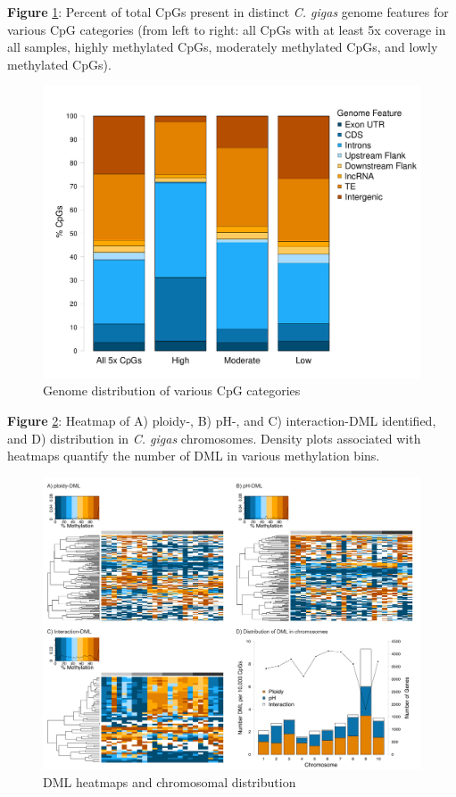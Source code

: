 \documentclass [11pt, proquest] {uwthesis}[2015/03/03]
\begin{document}
\textbf{Figure} \ref{fig:cpglocations}: Percent of total CpGs present in distinct \emph{C. gigas} genome features for various CpG categories (from left to right: all CpGs with at least 5x coverage in all samples, highly methylated CpGs, moderately methylated CpGs, and lowly methylated CpGs).\newline
\begin{figure}[h]
\centering
  \includegraphics[width=1\textwidth]{figure/Ch4/Figure4.2.pdf}
  \caption{Genome distribution of various CpG categories}
  \label{fig:cpglocations}
\end{figure}
\clearpage

\textbf{Figure} \ref{fig:multiheatmap}: Heatmap of A) ploidy-, B) pH-, and C) interaction-DML identified, and D) distribution in \emph{C. gigas} chromosomes. Density plots associated with heatmaps quantify the number of DML in various methylation bins.\newline
\begin{figure}[h]
\centering
  \includegraphics[width=1\textwidth]{figure/Ch4/Figure4.3.pdf}
  \caption{DML heatmaps and chromosomal distribution}
  \label{fig:multiheatmap}
\end{figure}
\clearpage
\end{document}
